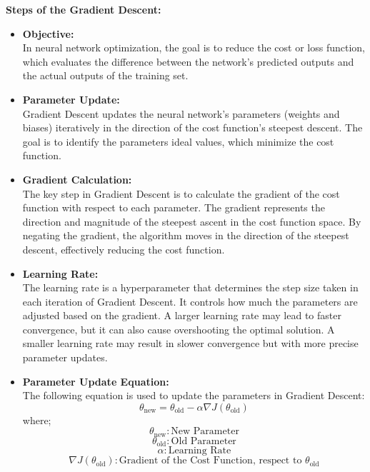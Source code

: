 \documentclass[conference]{IEEEtran}
\begin{document}
\noindent \textbf{Steps of the Gradient Descent:}
\begin{itemize}
    \item \textbf{Objective:} \\
    In neural network optimization, the goal is to reduce the cost or loss function, which evaluates the difference between the network's predicted outputs and the actual outputs of the training set.
    
    \item \textbf{Parameter Update:} \\
    Gradient Descent updates the neural network's parameters (weights and biases) iteratively in the direction of the cost function's steepest descent. The goal is to identify the parameters ideal values, which minimize the cost function.
    
    \item \textbf{Gradient Calculation:} \\
     The key step in Gradient Descent is to calculate the gradient of the cost function with respect to each parameter. The gradient represents the direction and magnitude of the steepest ascent in the cost function space. By negating the gradient, the algorithm moves in the direction of the steepest descent, effectively reducing the cost function.
    
    \item \textbf{Learning Rate:} \\
    The learning rate is a hyperparameter that determines the step size taken in each iteration of Gradient Descent. It controls how much the parameters are adjusted based on the gradient. A larger learning rate may lead to faster convergence, but it can also cause overshooting the optimal solution. A smaller learning rate may result in slower convergence but with more precise parameter updates.
    
    \item \textbf{Parameter Update Equation:} \\
    The following equation is used to update the parameters in Gradient Descent:
    $$
    \theta_{\text{new}} = \theta_{\text{old}} - \alpha \nabla J(\theta_{\text{old}})
    $$
    where;
    $$
    \theta_{\text{new}}: \text{New Parameter}
    $$
    $$
    \theta_{\text{old}}: \text{Old Parameter}
    $$
    $$
    \alpha: \text{Learning Rate}
    $$
    $$
    \nabla J(\theta_{\text{old}}): \text{Gradient of the Cost Function, respect to } \theta_{\text{old}}
    $$
    

\end{itemize}
\end{document}
